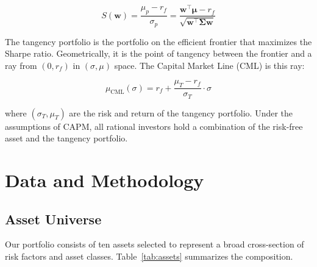 \documentclass[12pt]{article}
\begin{document}
\begin{equation}
  S(\mathbf{w}) = \frac{\mu_p - r_f}{\sigma_p}
                = \frac{\mathbf{w}^\top \boldsymbol{\mu} - r_f}
                       {\sqrt{\mathbf{w}^\top \boldsymbol{\Sigma} \mathbf{w}}}
\end{equation}

The tangency portfolio is the portfolio on the efficient frontier that
maximizes the Sharpe ratio. Geometrically, it is the point of tangency
between the frontier and a ray from $(0, r_f)$ in $(\sigma, \mu)$ space.
The Capital Market Line (CML) is this ray:

\begin{equation}
  \mu_{\text{CML}}(\sigma) = r_f + \frac{\mu_T - r_f}{\sigma_T} \cdot \sigma
\end{equation}

where $(\sigma_T, \mu_T)$ are the risk and return of the tangency portfolio.
Under the assumptions of CAPM, all rational investors hold a combination of
the risk-free asset and the tangency portfolio.

\section{Data and Methodology}
\label{sec:data}

\subsection{Asset Universe}

Our portfolio consists of ten assets selected to represent a broad
cross-section of risk factors and asset classes. Table~\ref{tab:assets}
summarizes the composition.
\end{document}
